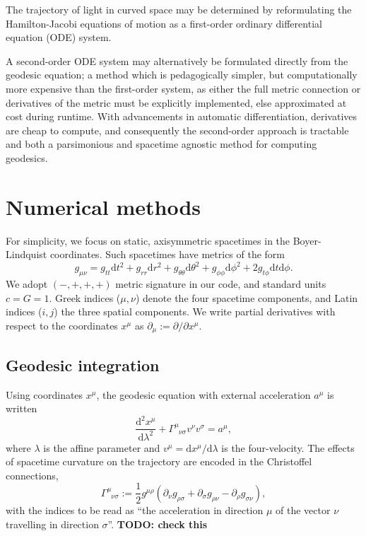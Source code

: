 \documentclass[fleqn,usenatbib]{mnras}
\newcommand{\todo}[1]{{\noindent \bf \color{red} TODO: #1}}
\renewcommand{\d}{\text{d}}
\newcommand{\utensor}[3]{#1^{#2}_{\phantom{#2}#3}}
\newcommand{\vel}[1]{v^{#1}}
\begin{document}
The trajectory of light in curved space may be determined by reformulating the
Hamilton-Jacobi equations of motion as a first-order ordinary differential
equation (ODE) system.

A second-order ODE system may alternatively be formulated directly from the
geodesic equation; a method which is pedagogically simpler, but computationally
more expensive than the first-order system, as either the full metric
connection or derivatives of the metric must be explicitly implemented, else
approximated at cost during runtime. With advancements in automatic
differentiation, derivatives are cheap to compute, and consequently the
second-order approach is tractable and both a parsimonious and spacetime
agnostic method for computing geodesics.

\section{Numerical methods}

For simplicity, we focus on static, axisymmetric spacetimes in the
Boyer-Lindquist coordinates. Such spacetimes have metrics of the form
\begin{equation}
\label{eq:static_axisymmetric_metric}
    g_{\mu\nu}
    = g_{tt} \d t^2
    + g_{rr} \d r^2
    + g_{\theta\theta} \d \theta^2
    + g_{\phi\phi} \d \phi^2
    + 2g_{t\phi} \d t \d \phi.
\end{equation}
We adopt $(-, +, +, +)$ metric signature in our code, and standard units $c = G
= 1$. Greek indices ($\mu, \nu$) denote the four spacetime components, and Latin
indices ($i, j$) the three spatial components. We write partial derivatives with
respect to the coordinates $x^\mu$ as $\partial_\mu := \partial / \partial
x^\mu$.

\subsection{Geodesic integration}

Using coordinates $x^\mu$, the geodesic equation with external acceleration
$a^\mu$ is written
\begin{equation}
\label{eq:geodesic_equation}
    \frac{\d^2 x^\mu}{\d \lambda^2}
    + \utensor{\Gamma}{\mu}{\nu\sigma}
    \vel{\nu}
    \vel{\sigma}
    = a^\mu,
\end{equation}
where $\lambda$ is the affine parameter and $v^\mu = \d x^\mu / \d \lambda$ is
the four-velocity. The effects of spacetime curvature on the trajectory are
encoded in the Christoffel connections,
\begin{equation}
\label{eq:christoffel}
    \utensor{\Gamma}{\mu}{\nu\sigma}
    := \frac{1}{2} g^{\mu\rho}
    \left(
        \partial_{\nu}g_{\rho \sigma}
        + \partial_{\sigma}g_{\rho \nu}
        - \partial_{\rho}g_{\sigma \nu}
    \right),
\end{equation}
with the indices to be read as ``the acceleration in direction $\mu$ of the
vector $\nu$ travelling in direction $\sigma$''. \todo{check this}
\end{document}
